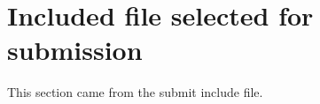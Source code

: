 \section*{Included file selected for submission}\noindent This section came from the submit include file.
